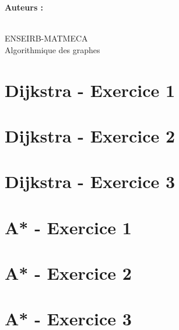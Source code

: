 \documentclass[a4paper,12pt]{article}
\title{\texteTitre}
\author{\texteAuteurs}
\date{\texteDate}
\begin{document}


\hypersetup{pageanchor=false}
\begin{titlepage}
    \centering

    \vspace*{1.5cm}

    {\Huge\bfseries \texteNumero\par}

    \vspace{0.8cm}

    {\LARGE \texteTitre \par}

    \vspace{7cm}

    {\Large
    \textbf{Auteurs :}\\
    \texteAuteurs\par}

    \vfill

    {\large
    \texteDate\\
    ENSEIRB-MATMECA\\
    Algorithmique des graphes
    \par}

    \vspace{1cm}

\end{titlepage}
\hypersetup{pageanchor=true} %


\section{Dijkstra - Exercice 1}


\section{Dijkstra - Exercice 2}

\newpage
\section{Dijkstra - Exercice 3}

\newpage
\section{A* - Exercice 1}

\section{A* - Exercice 2}

\section{A* - Exercice 3}

\end{document}
